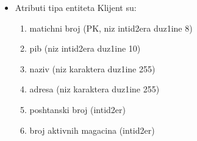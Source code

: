 \begin{itemize}
    \item 



Atributi tipa entiteta Klijent su:
\begin{enumerate}
    \item{matichni broj (PK, niz intid2era duz1ine 8)}
    \item{pib (niz intid2era duz1ine 10)}
    \item{naziv (niz karaktera duz1ine 255)}
    \item{adresa (niz karaktera duz1ine 255)}
    \item{poshtanski broj (intid2er)}
    \item{broj aktivnih magacina (intid2er)}
\end{enumerate}


\end{itemize}
